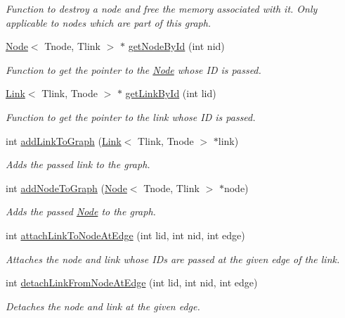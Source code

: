 \begin{DoxyCompactItemize}
\begin{DoxyCompactList}\small\item\em Function to destroy a node and free the memory associated with it. Only applicable to nodes which are part of this graph. \end{DoxyCompactList}\item 
\hyperlink{classNode}{Node}$<$ Tnode, Tlink $>$ $\ast$ \hyperlink{classGraph_ad19bc391954e8df145149acfbdbba0cd}{get\+Node\+By\+Id} (int nid)
\begin{DoxyCompactList}\small\item\em Function to get the pointer to the \hyperlink{classNode}{Node} whose I\+D is passed. \end{DoxyCompactList}\item 
\hyperlink{classLink}{Link}$<$ Tlink, Tnode $>$ $\ast$ \hyperlink{classGraph_a2c205de5e88b199f24d1993e829df4b6}{get\+Link\+By\+Id} (int lid)
\begin{DoxyCompactList}\small\item\em Function to get the pointer to the link whose I\+D is passed. \end{DoxyCompactList}\item 
int \hyperlink{classGraph_afe92a65949d7bdc372feb09f99e4f5cf}{add\+Link\+To\+Graph} (\hyperlink{classLink}{Link}$<$ Tlink, Tnode $>$ $\ast$link)
\begin{DoxyCompactList}\small\item\em Adds the passed link to the graph. \end{DoxyCompactList}\item 
int \hyperlink{classGraph_ab2a7e149c924c444167097295f404566}{add\+Node\+To\+Graph} (\hyperlink{classNode}{Node}$<$ Tnode, Tlink $>$ $\ast$node)
\begin{DoxyCompactList}\small\item\em Adds the passed \hyperlink{classNode}{Node} to the graph. \end{DoxyCompactList}\item 
int \hyperlink{classGraph_ad7a9773e4b36196df9221116c8a7abd7}{attach\+Link\+To\+Node\+At\+Edge} (int lid, int nid, int edge)
\begin{DoxyCompactList}\small\item\em Attaches the node and link whose I\+Ds are passed at the given edge of the link. \end{DoxyCompactList}\item 
int \hyperlink{classGraph_a045bcbd5cfbbf87bc55deab5f0be477a}{detach\+Link\+From\+Node\+At\+Edge} (int lid, int nid, int edge)
\begin{DoxyCompactList}\small\item\em Detaches the node and link at the given edge. \end{DoxyCompactList}\end{DoxyCompactItemize}


